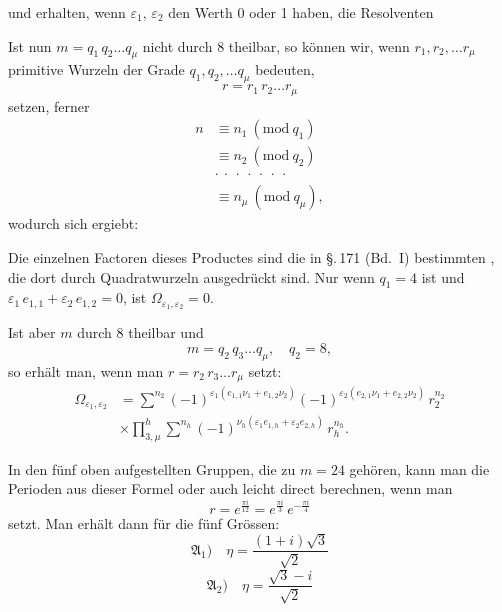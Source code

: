 und erhalten, wenn $\varepsilon_1$, $\varepsilon_2$ den Werth 0 oder 1 haben, die Resolventen


Ist nun $m = q_1\, q_2 \ldots q_\mu$ nicht durch 8 theilbar, so können
wir, wenn $r_1, r_2, \ldots r_\mu$ primitive Wurzeln der Grade $q_1, q_2, \ldots q_\mu$
bedeuten,
\[ r = r_1\, r_2 \ldots r_\mu \]
setzen, ferner
\[ \begin{aligned}
n &\equiv n_1\ (\mathrm{mod}\ q_1)\\
&\equiv n_2\ (\mathrm{mod}\ q_2)\\
&\cdot\ \cdot\ \cdot\ \cdot\ \cdot\ \cdot\ \cdot\\
&\equiv n_\mu\ (\mathrm{mod}\ q_\mu),
\end{aligned} \]
wodurch sich ergiebt:

Die einzelnen Factoren dieses Productes sind die in \S.\,171
(Bd.\ I) bestimmten , die dort durch
Quadratwurzeln ausgedrückt sind. Nur wenn $q_1 = 4$ ist und
$\varepsilon_1\, e_{1,1} + \varepsilon_2\, e_{1,2} = 0$, ist $\Omega_{\varepsilon_1,\varepsilon_2} = 0$. %

Ist aber $m$ durch 8 theilbar und
\[ m = q_2\, q_3 \ldots q_\mu, \quad q_2 = 8, \]
so erhält man, wenn man $r = r_2\, r_3 \ldots r_\mu$ setzt:
\[ \begin{aligned}
\Omega_{\varepsilon_1,\varepsilon_2} &= \sum^{n_2} (-1)^{\varepsilon_1(e_{1,1}\nu_1+e_{1,2}\nu_2)}(-1)^{\varepsilon_2(e_{2,1}\nu_1+e_{2,2}\nu_2)}\, r_2^{n_2}\\
&\times \prod_{3,\mu}^{h} \sum^{n_h} (-1)^{\nu_h(\varepsilon_1 e_{1,h}+\varepsilon_2 e_{2,h})}\, r_h^{n_h}.
\end{aligned} \]

In den fünf oben aufgestellten Gruppen, die zu $m = 24$
gehören, kann man die Perioden aus dieser Formel oder auch
leicht direct berechnen, wenn man
\[ r = e^{\frac{\pi i}{12}} = e^{\frac{\pi i}{3}}\, e^{-\frac{\pi i}{4}} \]
setzt. Man erhält dann für die fünf Grössen:
\[ \mathfrak{A}_1)\quad \eta = \frac{(1+i)\sqrt{3}}{\sqrt{2}} \]
\[ \mathfrak{A}_2)\quad \eta = \frac{\sqrt{3}-i}{\sqrt{2}} \]
